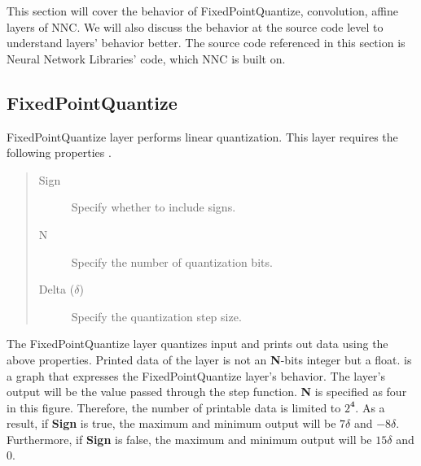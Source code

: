 
This section will cover the behavior of FixedPointQuantize, convolution, affine layers of NNC. We will also discuss the behavior at the source code level to understand layers' behavior better. The source code referenced in this section is Neural Network Libraries' code, which NNC is built on.



\subsection{FixedPointQuantize}
FixedPointQuantize layer performs linear quantization. This layer requires the following properties \cite{man:nnc}.

\begin{quote}
\begin{description}
  \item[Sign] Specify whether to include signs.
  \item[N] Specify the number of quantization bits.
  \item[Delta ($\delta$)] Specify the quantization step size.
\end{description}
\end{quote}

The FixedPointQuantize layer quantizes input and prints out data using the above properties. Printed data of the layer is not an \textbf{N}-bits integer but a float.  is a graph that expresses the FixedPointQuantize layer's behavior. The layer's output will be the value passed through the step function. \textbf{N} is specified as four in this figure. Therefore, the number of printable data is limited to $2^\textbf{4}$. As a result, if \textbf{Sign} is true, the maximum and minimum output will be $7\delta$ and $-8\delta$. Furthermore, if \textbf{Sign} is false, the maximum and minimum output will be $15\delta$ and $0$.



